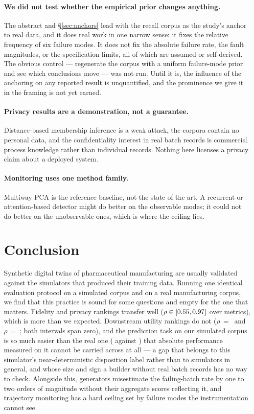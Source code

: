 \documentclass[11pt]{article}
\begin{document}
\paragraph{We did not test whether the empirical prior changes anything.} The
abstract and \S\ref{sec:anchors} lead with the recall corpus as the study's
anchor to real data, and it does real work in one narrow sense: it fixes the
relative frequency of six failure modes. It does not fix the absolute failure
rate, the fault magnitudes, or the specification limits, all of which are assumed
or self-derived. The obvious control --- regenerate the corpus with a uniform
failure-mode prior and see which conclusions move --- was not run. Until it is,
the influence of the anchoring on any reported result is unquantified, and the
prominence we give it in the framing is not yet earned.

\paragraph{Privacy results are a demonstration, not a guarantee.} Distance-based
membership inference is a weak attack, the corpora contain no personal data, and
the confidentiality interest in real batch records is commercial process
knowledge rather than individual records. Nothing here licenses a privacy claim
about a deployed system.

\paragraph{Monitoring uses one method family.} Multiway PCA is the reference
baseline, not the state of the art. A recurrent or attention-based detector might
do better on the observable modes; it could not do better on the unobservable
ones, which is where the ceiling lies.

\section{Conclusion}

Synthetic digital twins of pharmaceutical manufacturing are usually validated
against the simulators that produced their training data. Running one identical
evaluation protocol on a simulated corpus and on a real manufacturing corpus, we
find that this practice is sound for some questions and empty for the one that
matters. Fidelity and privacy rankings transfer well
($\rho \in [0.55{}, 0.97{}]$ over \agreeFidPrivN{} metrics),
which is more than we expected. Downstream utility rankings do not
($\rho$~=~\ciAurocRho{} and $\rho$~=~\ciAuprcRho{}; both intervals span zero),
and the prediction
task on our simulated corpus is so much easier than the real one
(\trtrAuprcSim{} against \trtrAuprcReal{}) that absolute performance measured on
it cannot be carried across at all --- a gap that belongs to this simulator's
near-deterministic disposition label rather than to simulators in general, and
whose size and sign a builder without real batch records has no way to check. Alongside this, generators misestimate the failing-batch rate by
one to two orders of magnitude without their aggregate scores reflecting it, and
trajectory monitoring has a hard ceiling set by failure modes the instrumentation
cannot see.
\end{document}
